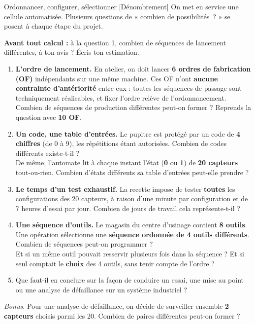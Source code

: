 \documentclass[a4paper,11pt]{article}
\begin{document}
\begin{exo}{Ordonnancer, configurer, sélectionner \hfill \normalfont\color{uimmlightblue}[Dénombrement]}
On met en service une cellule automatisée. Plusieurs questions de « combien de possibilités~? » se posent à chaque étape du projet.

\begin{intuition}
\textbf{Avant tout calcul :} à la question 1, combien de séquences de lancement différentes, à ton avis ? Écris ton estimation. \dotfill
\end{intuition}

\begin{enumerate}
  \item \textbf{L'ordre de lancement.} En atelier, on doit lancer \textbf{6 ordres de fabrication (OF)} indépendants sur une même machine. Ces OF n'ont \textbf{aucune contrainte d'antériorité} entre eux : toutes les séquences de passage sont techniquement réalisables, et fixer l'ordre relève de l'ordonnancement. Combien de séquences de production différentes peut-on former ? Reprends la question avec \textbf{10 OF}.
  \item \textbf{Un code, une table d'entrées.} Le pupitre est protégé par un code de \textbf{4 chiffres} (de 0 à 9), les répétitions étant autorisées. Combien de codes différents existe-t-il ? \\
  De même, l'automate lit à chaque instant l'état (\textbf{0} ou \textbf{1}) de \textbf{20 capteurs} tout-ou-rien. Combien d'états différents sa table d'entrées peut-elle prendre ?
  \item \textbf{Le temps d'un test exhaustif.} La recette impose de tester \textbf{toutes} les configurations des 20 capteurs, à raison d'une minute par configuration et de 7 heures d'essai par jour. Combien de jours de travail cela représente-t-il ?
  \item \textbf{Une séquence d'outils.} Le magasin du centre d'usinage contient \textbf{8 outils}. Une opération sélectionne une \textbf{séquence ordonnée de 4 outils différents}. Combien de séquences peut-on programmer ? \\
  Et si un même outil pouvait resservir plusieurs fois dans la séquence ? Et si seul comptait le \textbf{choix} des 4 outils, sans tenir compte de l'ordre ?
  \item Que faut-il en conclure sur la façon de conduire un essai, une mise au point ou une analyse de défaillance sur un système industriel ?
\end{enumerate}

\vspace{4pt}
\textit{Bonus.} Pour une analyse de défaillance, on décide de surveiller ensemble \textbf{2 capteurs} choisis parmi les 20. Combien de paires différentes peut-on former ?
\end{exo}
\end{document}
